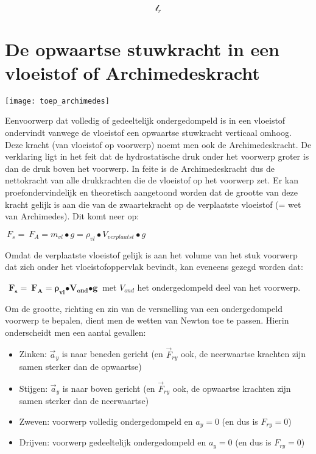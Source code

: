 \documentclass{ximera}
\begin{document}
\[\mathcal{l}_{r}\]

\section*{De opwaartse stuwkracht in een vloeistof of Archimedeskracht}

\begin{image}  
  \texttt{[image: toep\_archimedes]}
\end{image}


Eenvoorwerp dat volledig of gedeeltelijk ondergedompeld is in een vloeistof ondervindt vanwege de vloeistof een opwaartse stuwkracht verticaal omhoog. 
Deze kracht (van vloeistof op voorwerp) noemt men ook de Archimedeskracht. 
De verklaring ligt in het feit dat de hydrostatische druk onder het voorwerp groter is dan de druk boven het voorwerp. 
In feite is de Archimedeskracht dus de nettokracht van alle drukkrachten die de vloeistof op het voorwerp zet. 
Er kan proefondervindelijk en theoretisch aangetoond worden dat de grootte van deze kracht gelijk is aan die van de zwaartekracht op de verplaatste vloeistof (= wet van
Archimedes). 
Dit komt neer op:

\({\ F}_{s} = {\ F}_{A} = m_{vl} \bullet g = \rho_{vl} \bullet V_{verplaatst} \bullet g\)

Omdat de verplaatste vloeistof gelijk is aan het volume van het stuk voorwerp dat zich onder het vloeistofoppervlak bevindt, kan eveneens gezegd worden dat:

\({\mathbf{\ \ }\mathbf{F}}_{\mathbf{s}}\mathbf{=}{\mathbf{\ }\mathbf{F}}_{\mathbf{A}}\mathbf{=}\mathbf{\rho}_{\mathbf{vl}}\mathbf{\bullet}\mathbf{V}_{\mathbf{ond}}\mathbf{\bullet g\ }\)
met \(V_{ond}\) het ondergedompeld deel van het voorwerp. 

Om de grootte, richting en zin van de versnelling van een ondergedompeld voorwerp te bepalen, dient men de wetten van Newton toe te passen.
Hierin onderscheidt men een aantal gevallen:

\begin{itemize}
\item Zinken: \({\overrightarrow{a}}_{y}\) is naar beneden gericht (en
  \({\overrightarrow{F}}_{ry}\) ook, de neerwaartse krachten zijn samen
  sterker dan de opwaartse)
\item Stijgen: \({\overrightarrow{a}}_{y}\) is naar boven gericht (en
  \({\overrightarrow{F}}_{ry}\) ook, de opwaartse krachten zijn samen
  sterker dan de neerwaartse)
\item Zweven: voorwerp volledig ondergedompeld en \(a_{y} = 0\) (en dus is
  \(F_{ry} = 0\))
\item Drijven: voorwerp gedeeltelijk ondergedompeld en \(a_{y} = 0\) (en dus
  is \(F_{ry} = 0\))
\end{itemize}
\end{document}
